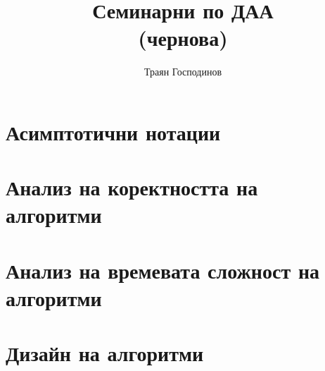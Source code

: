 \documentclass[a4paper,12pt,oneside]{book}%
\title{Семинарни по ДАА\\\large (чернова)}
\author{Траян Господинов}
\begin{document}
 
	
	\maketitle
	
	\tableofcontents
	
	\chapter{Асимптотични нотации}
	
	
	\chapter{Анализ на коректността на алгоритми}
	
	
	\chapter{Анализ на времевата сложност на алгоритми}
	

	\chapter{Дизайн на алгоритми}
	

\end{document}
